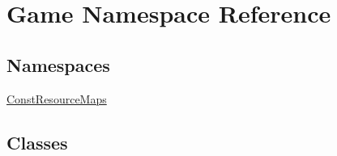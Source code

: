 \hypertarget{namespaceGame}{\section{Game Namespace Reference}
\label{namespaceGame}
}
\subsection*{Namespaces}
\begin{DoxyCompactItemize}
\item 
\hyperlink{namespaceGame_1_1ConstResourceMaps}{Const\-Resource\-Maps}
\end{DoxyCompactItemize}
\subsection*{Classes}
